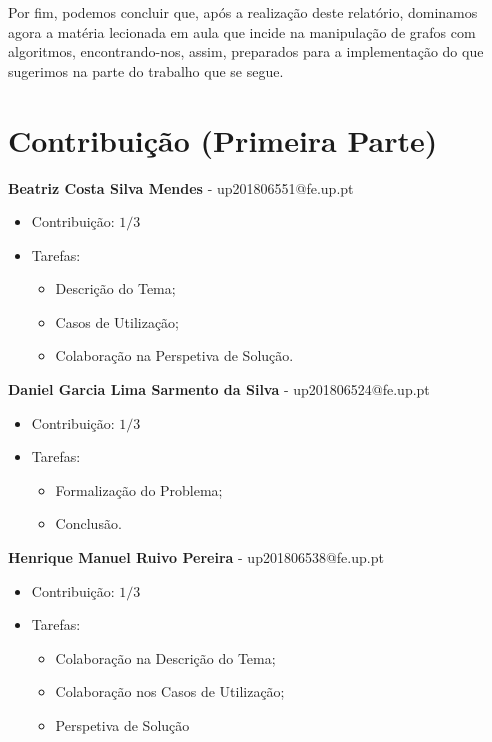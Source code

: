 \documentclass[article, a4paper, 12pt, oneside]{memoir}
\begin{document}
Por fim, podemos concluir que, após a realização deste relatório, dominamos agora a matéria lecionada em aula que incide na manipulação de grafos com algoritmos, encontrando-nos, assim, preparados para a implementação do que sugerimos na parte do trabalho que se segue.


\newpage
\chapter[Contribuição (Primeira Parte)][Contribuição (Primeira Parte)]{Contribuição (Primeira Parte)} \label{\thechapter}

\textbf{Beatriz Costa Silva Mendes} - up201806551@fe.up.pt

\begin{itemize}
\item Contribuição: $1/3$
\item Tarefas:
	\begin{itemize}
	\item Descrição do Tema;
	\item Casos de Utilização;
	\item Colaboração na Perspetiva de Solução.
	\end{itemize}
\end{itemize}


\textbf{Daniel Garcia Lima Sarmento da Silva} - up201806524@fe.up.pt

\begin{itemize}
\item Contribuição: $1/3$
\item Tarefas:
	\begin{itemize}
	\item Formalização do Problema;
	\item Conclusão.
	\end{itemize}
\end{itemize}


\textbf{Henrique Manuel Ruivo Pereira} - up201806538@fe.up.pt

\begin{itemize}
\item Contribuição: $1/3$
\item Tarefas:
	\begin{itemize}
	\item Colaboração na Descrição do Tema;
	\item Colaboração nos Casos de Utilização;
	\item Perspetiva de Solução
	\end{itemize}
\end{itemize}
\end{document}
